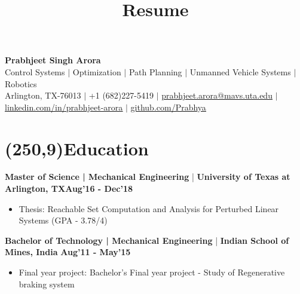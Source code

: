 \documentclass[10pt,a4paper]{extarticle}
\title{Resume}
\newcommand{\changeurlcolor}[1]{\hypersetup{urlcolor=#1}}
\begin{document}
\begin{center}
\textbf{\huge {Prabhjeet Singh Arora}}\\
\small{Control Systems $|$ Optimization $|$ Path Planning $|$ Unmanned Vehicle Systems $|$ Robotics}\\
\small{Arlington, TX-76013 $|$ +1 (682)227-5419 $|$ \href{prabhjeet.arora@mavs.uta.edu}{\ul{prabhjeet.arora@mavs.uta.edu}} $|$ \changeurlcolor{cyan}\href{http://www.linkedin.com/in/prabhjeet-arora}{\ul{linkedin.com/in/prabhjeet-arora}} $|$ \changeurlcolor{blue}\href{https://github.com/Prabhya}{\ul{github.com/Prabhya}}}
\end{center}

\section*{\colorbox{gray!10}{\makebox(250,9){\textcolor{blue!65}{Education\hfill}}}}
\textbf{Master of Science | Mechanical Engineering} | \textbf{University of Texas at Arlington, TX}\hfill\textbf{Aug'16 - Dec'18}
\vspace{-0.5em}
\begin{itemize}[leftmargin = 0.6cm]
\setlength\itemsep{-0.2em}
\item Thesis: Reachable Set Computation and Analysis for Perturbed Linear Systems \hfill(GPA - 3.78/4) 
\end{itemize}
\textbf{Bachelor of Technology | Mechanical Engineering} | \textbf{Indian School of Mines, India} \hfill\textbf{Aug'11 - May'15}
\vspace{-0.5em}
\begin{itemize}[leftmargin = 0.6cm]
\setlength\itemsep{-0.2em}
\item Final year project: Bachelor's Final year project - Study of Regenerative braking system
\end{itemize}


\vspace{-0.2cm}
\end{document}

